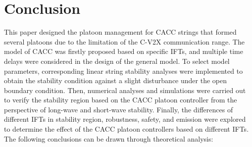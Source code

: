 \documentclass[journal]{IEEEtran}
\begin{document}




\section{Conclusion}
\label{Section 6}
This paper designed the platoon management for CACC strings that formed several platoons due to the limitation of the C-V2X communication range. The model of CACC was firstly proposed based on specific IFTs, and multiple time delays were considered in the design of the general model. To select model parameters, corresponding linear string stability analyses were implemented to obtain the stability condition against a slight disturbance under the open boundary condition. Then, numerical analyses and simulations were carried out to verify the stability region based on the CACC platoon controller from the perspective of long-wave and short-wave stability. Finally, the differences of different IFTs in stability region, robustness, safety, and emission were explored to determine the effect of the CACC platoon controllers based on different IFTs. The following conclusions can be drawn through theoretical analysis:
\end{document}
